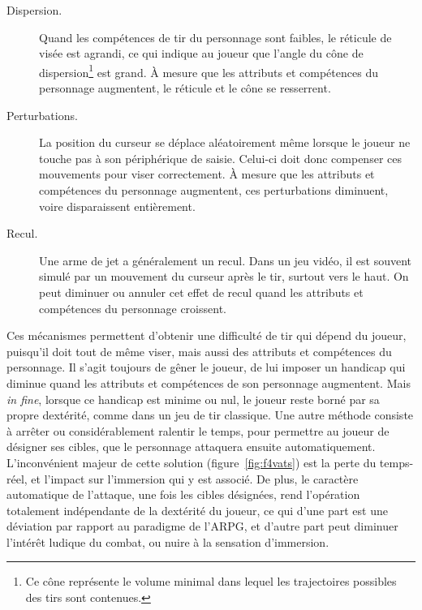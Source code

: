 	\begin{description}
		\item[Dispersion.] Quand les compétences de tir du personnage sont faibles, le réticule de visée est agrandi, ce qui indique au joueur que l'angle du cône de dispersion\footnote{Ce cône représente le volume minimal dans lequel les trajectoires possibles des tirs sont contenues.} est grand. À mesure que les attributs et compétences du personnage augmentent, le réticule et le cône se resserrent.
		\item[Perturbations.] La position du curseur se déplace aléatoirement même lorsque le joueur ne touche pas à son périphérique de saisie. Celui-ci doit donc compenser ces mouvements pour viser correctement. À mesure que les attributs et compétences du personnage augmentent, ces perturbations diminuent, voire disparaissent entièrement.
		\item[Recul.] Une arme de jet a généralement un recul. Dans un jeu vidéo, il est souvent simulé par un mouvement du curseur après le tir, surtout vers le haut. On peut diminuer ou annuler cet effet de recul quand les attributs et compétences du personnage croissent.
	\end{description}

	Ces mécanismes permettent d'obtenir une difficulté de tir qui dépend du joueur, puisqu'il doit tout de même viser, mais aussi des attributs et compétences du personnage. Il s'agit toujours de gêner le joueur, de lui imposer un handicap qui diminue quand les attributs et compétences de son personnage augmentent. Mais \emph{in fine}, lorsque ce handicap est minime ou nul, le joueur reste borné par sa propre dextérité, comme dans un jeu de tir classique. Une autre méthode consiste à arrêter ou considérablement ralentir le temps, pour permettre au joueur de désigner ses cibles, que le personnage attaquera ensuite automatiquement. L'inconvénient majeur de cette solution (figure~\ref{fig:f4vats}) est la perte du temps-réel, et l'impact sur l'immersion qui y est associé. De plus, le caractère automatique de l'attaque, une fois les cibles désignées, rend l'opération totalement indépendante de la dextérité du joueur, ce qui d'une part est une déviation par rapport au paradigme de l'ARPG, et d'autre part peut diminuer l'intérêt ludique du combat, ou nuire à la sensation d'immersion.
	
